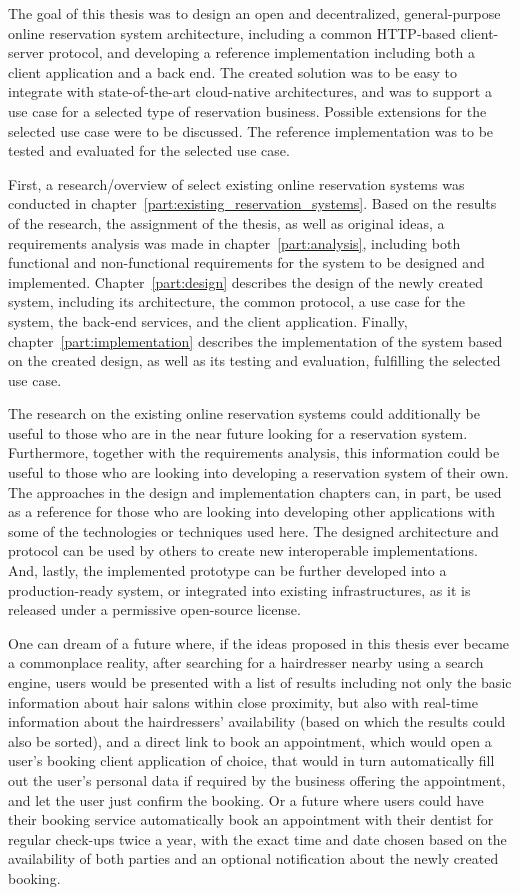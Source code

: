 The goal of this thesis was to design an open and decentralized, general-purpose online reservation system architecture, including a common HTTP-based client-server protocol, and developing a reference implementation including both a client application and a back end. The created solution was to be easy to integrate with state-of-the-art cloud-native architectures, and was to support a use case for a selected type of reservation business. Possible extensions for the selected use case were to be discussed. The reference implementation was to be tested and evaluated for the selected use case.

First, a research/overview of select existing online reservation systems was conducted in chapter~\ref{part:existing_reservation_systems}. Based on the results of the research, the assignment of the thesis, as well as original ideas, a requirements analysis was made in chapter~\ref{part:analysis}, including both functional and non-functional requirements for the system to be designed and implemented. Chapter~\ref{part:design} describes the design of the newly created system, including its architecture, the common protocol, a use case for the system, the back-end services, and the client application. Finally, chapter~\ref{part:implementation} describes the implementation of the system based on the created design, as well as its testing and evaluation, fulfilling the selected use case.

The research on the existing online reservation systems could additionally be useful to those who are in the near future looking for a reservation system. Furthermore, together with the requirements analysis, this information could be useful to those who are looking into developing a reservation system of their own. The approaches in the design and implementation chapters can, in part, be used as a reference for those who are looking into developing other applications with some of the technologies or techniques used here. The designed architecture and protocol can be used by others to create new interoperable implementations. And, lastly, the implemented prototype can be further developed into a production-ready system, or integrated into existing infrastructures, as it is released under a permissive open-source license.

One can dream of a future where, if the ideas proposed in this thesis ever became a commonplace reality, after searching for a hairdresser nearby using a search engine, users would be presented with a list of results including not only the basic information about hair salons within close proximity, but also with real-time information about the hairdressers' availability (based on which the results could also be sorted), and a direct link to book an appointment, which would open a user's booking client application of choice, that would in turn automatically fill out the user's personal data if required by the business offering the appointment, and let the user just confirm the booking. Or a future where users could have their booking service automatically book an appointment with their dentist for regular check-ups twice a year, with the exact time and date chosen based on the availability of both parties and an optional notification about the newly created booking.
